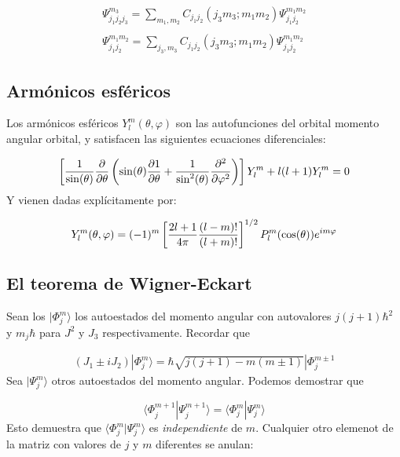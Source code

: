 \begin{equation}
    \begin{array}{c}
    \Psi^{m_3}_{j_1j_2j_3} = \sum_{m_1,m_2} C_{j_1j_2} (j_3 m_3; m_1 m_2) \Psi^{m_1 m_2}_{j_1 j_2} \\ \\
    \Psi^{m_1 m_2}_{j_1j_2} = \sum_{j_3,m_3} C_{j_1j_2} (j_3 m_3; m_1 m_2) \Psi^{m_1 m_2}_{j_1 j_2} 
    \end{array}
\end{equation}

\subsection{Armónicos esféricos}

Los armónicos esféricos $Y_l^m (\theta, \varphi)$ son las autofunciones del orbital momento angular orbital, y satisfacen las siguientes ecuaciones diferenciales:

\begin{equation}
    \left[ \frac{1}{\sin (\theta)} \frac{\partial }{\partial \theta} \left( \sin (\theta) \frac{\partial 1}{\partial \theta} + \frac{1}{\sin^2 (\theta)} \frac{\partial ^2}{\partial \varphi^2} \right) \right] Y_l^m + l(l+1) Y_l^m = 0
\end{equation}
Y vienen dadas explícitamente por:

\begin{equation}
    Y_l^m (\theta,\varphi) = (-1)^m \left[ \frac{2l+1}{4 \pi} \frac{(l-m)!}{(l+m)!} \right]^{1/2} P_l^m (\cos (\theta)) e^{im\varphi}
\end{equation}

\subsection{El teorema de Wigner-Eckart}

Sean los $|\Phi_j^m\rangle$ los autoestados del momento angular con autovalores $j(j+1 )\hbar^2$ y $m_j \hbar$ para $J^2$ y $J_3$ respectivamente. Recordar que

\begin{eqnarray}
    (J_1\pm iJ_2) |\Phi_j^m \rangle = \hbar \sqrt{j(j+1)-m(m\pm 1)} |\Phi_j^{m\pm 1}
\end{eqnarray}
Sea $|\Psi_j^m\rangle$ otros autoestados del momento angular. Podemos demostrar que

\begin{equation}
    \langle \Phi_j^{m+1} | \Psi_j^{m+1} \rangle = \langle \Phi_j^m |\Psi_j^m \rangle
\end{equation}
Esto demuestra que $\langle \Phi_j^m |\Psi_j^m \rangle$ es {\it independiente} de $m$. Cualquier otro elemenot de la matriz con valores de $j$ y $m$ diferentes se anulan:

